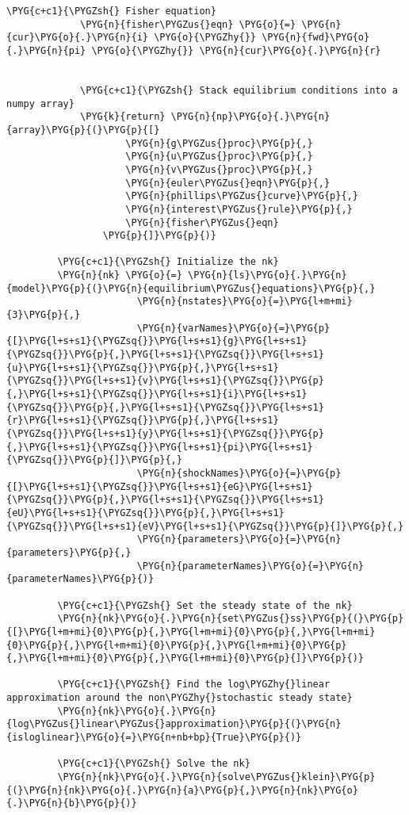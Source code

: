\documentclass[letterpaper,10pt,openany,oneside,english]{sphinxmanual}
\begin{document}
\begin{Verbatim}[commandchars=\\\{\}]
             \PYG{c+c1}{\PYGZsh{} Fisher equation}
             \PYG{n}{fisher\PYGZus{}eqn} \PYG{o}{=} \PYG{n}{cur}\PYG{o}{.}\PYG{n}{i} \PYG{o}{\PYGZhy{}} \PYG{n}{fwd}\PYG{o}{.}\PYG{n}{pi} \PYG{o}{\PYGZhy{}} \PYG{n}{cur}\PYG{o}{.}\PYG{n}{r}
         
         
             \PYG{c+c1}{\PYGZsh{} Stack equilibrium conditions into a numpy array}
             \PYG{k}{return} \PYG{n}{np}\PYG{o}{.}\PYG{n}{array}\PYG{p}{(}\PYG{p}{[}
                     \PYG{n}{g\PYGZus{}proc}\PYG{p}{,}
                     \PYG{n}{u\PYGZus{}proc}\PYG{p}{,}
                     \PYG{n}{v\PYGZus{}proc}\PYG{p}{,}
                     \PYG{n}{euler\PYGZus{}eqn}\PYG{p}{,}
                     \PYG{n}{phillips\PYGZus{}curve}\PYG{p}{,}
                     \PYG{n}{interest\PYGZus{}rule}\PYG{p}{,}
                     \PYG{n}{fisher\PYGZus{}eqn}
                 \PYG{p}{]}\PYG{p}{)}
         
         \PYG{c+c1}{\PYGZsh{} Initialize the nk}
         \PYG{n}{nk} \PYG{o}{=} \PYG{n}{ls}\PYG{o}{.}\PYG{n}{model}\PYG{p}{(}\PYG{n}{equilibrium\PYGZus{}equations}\PYG{p}{,}
                       \PYG{n}{nstates}\PYG{o}{=}\PYG{l+m+mi}{3}\PYG{p}{,}
                       \PYG{n}{varNames}\PYG{o}{=}\PYG{p}{[}\PYG{l+s+s1}{\PYGZsq{}}\PYG{l+s+s1}{g}\PYG{l+s+s1}{\PYGZsq{}}\PYG{p}{,}\PYG{l+s+s1}{\PYGZsq{}}\PYG{l+s+s1}{u}\PYG{l+s+s1}{\PYGZsq{}}\PYG{p}{,}\PYG{l+s+s1}{\PYGZsq{}}\PYG{l+s+s1}{v}\PYG{l+s+s1}{\PYGZsq{}}\PYG{p}{,}\PYG{l+s+s1}{\PYGZsq{}}\PYG{l+s+s1}{i}\PYG{l+s+s1}{\PYGZsq{}}\PYG{p}{,}\PYG{l+s+s1}{\PYGZsq{}}\PYG{l+s+s1}{r}\PYG{l+s+s1}{\PYGZsq{}}\PYG{p}{,}\PYG{l+s+s1}{\PYGZsq{}}\PYG{l+s+s1}{y}\PYG{l+s+s1}{\PYGZsq{}}\PYG{p}{,}\PYG{l+s+s1}{\PYGZsq{}}\PYG{l+s+s1}{pi}\PYG{l+s+s1}{\PYGZsq{}}\PYG{p}{]}\PYG{p}{,}
                       \PYG{n}{shockNames}\PYG{o}{=}\PYG{p}{[}\PYG{l+s+s1}{\PYGZsq{}}\PYG{l+s+s1}{eG}\PYG{l+s+s1}{\PYGZsq{}}\PYG{p}{,}\PYG{l+s+s1}{\PYGZsq{}}\PYG{l+s+s1}{eU}\PYG{l+s+s1}{\PYGZsq{}}\PYG{p}{,}\PYG{l+s+s1}{\PYGZsq{}}\PYG{l+s+s1}{eV}\PYG{l+s+s1}{\PYGZsq{}}\PYG{p}{]}\PYG{p}{,}
                       \PYG{n}{parameters}\PYG{o}{=}\PYG{n}{parameters}\PYG{p}{,}
                       \PYG{n}{parameterNames}\PYG{o}{=}\PYG{n}{parameterNames}\PYG{p}{)}
         
         \PYG{c+c1}{\PYGZsh{} Set the steady state of the nk}
         \PYG{n}{nk}\PYG{o}{.}\PYG{n}{set\PYGZus{}ss}\PYG{p}{(}\PYG{p}{[}\PYG{l+m+mi}{0}\PYG{p}{,}\PYG{l+m+mi}{0}\PYG{p}{,}\PYG{l+m+mi}{0}\PYG{p}{,}\PYG{l+m+mi}{0}\PYG{p}{,}\PYG{l+m+mi}{0}\PYG{p}{,}\PYG{l+m+mi}{0}\PYG{p}{,}\PYG{l+m+mi}{0}\PYG{p}{]}\PYG{p}{)}
         
         \PYG{c+c1}{\PYGZsh{} Find the log\PYGZhy{}linear approximation around the non\PYGZhy{}stochastic steady state}
         \PYG{n}{nk}\PYG{o}{.}\PYG{n}{log\PYGZus{}linear\PYGZus{}approximation}\PYG{p}{(}\PYG{n}{isloglinear}\PYG{o}{=}\PYG{n+nb+bp}{True}\PYG{p}{)}
         
         \PYG{c+c1}{\PYGZsh{} Solve the nk}
         \PYG{n}{nk}\PYG{o}{.}\PYG{n}{solve\PYGZus{}klein}\PYG{p}{(}\PYG{n}{nk}\PYG{o}{.}\PYG{n}{a}\PYG{p}{,}\PYG{n}{nk}\PYG{o}{.}\PYG{n}{b}\PYG{p}{)}
\end{Verbatim}
\end{document}
